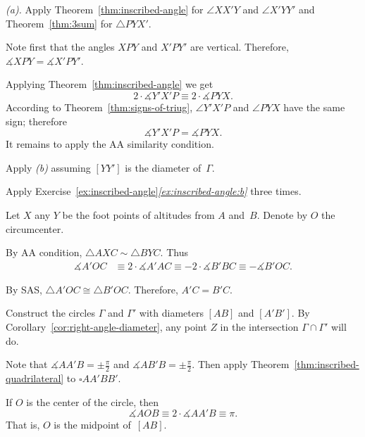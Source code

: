  \textit{(a).}
Apply Theorem~\ref{thm:inscribed-angle} for $\angle XX'Y$ and $\angle X'YY'$
and Theorem~\ref{thm:3sum} for $\triangle PYX'$.

 Note first that the angles $XPY$ and $X'PY'$ are vertical.
Therefore, $\measuredangle XPY=\measuredangle X'PY'$.

Applying Theorem~\ref{thm:inscribed-angle} we get
$$2\cdot \measuredangle Y'X'P\equiv 2\cdot\measuredangle PYX.$$
According to Theorem~\ref{thm:signs-of-triug}, $\angle Y'X'P$ and $\angle PYX$ have the same sign;
therefore
$$\measuredangle Y'X'P= \measuredangle PYX.$$
It remains to apply the AA similarity condition.

 Apply \textit{(b)} assuming $[YY']$ is the diameter of~$\Gamma$. 

 Apply Exercise~\ref{ex:inscribed-angle}\textit{\ref{ex:inscribed-angle:b}}
three times.

Let $X$ any $Y$ be the foot points of altitudes from $A$ and~$B$.
Denote by $O$ the circumcenter.
 
By AA condition, $\triangle A X C\sim \triangle B Y C$.
Thus 
\begin{align*}
\measuredangle A'OC
&\equiv 
2\cdot \measuredangle A' A C
\equiv-2\cdot\measuredangle B' B C
\equiv-\measuredangle B'OC.
\end{align*}


By SAS, $\triangle A'OC\cong\triangle B'OC$.
Therefore, $A'C=B'C$.

Construct the circles $\Gamma$ and $\Gamma'$
with diameters $[AB]$ and $[A'B']$.
By Corollary~\ref{cor:right-angle-diameter},
any point $Z$ in the intersection $\Gamma\cap \Gamma'$ will do.

Note that $\measuredangle AA'B=\pm\tfrac\pi2$ and $\measuredangle AB'B=\pm\tfrac\pi2$.
Then apply Theorem~\ref{thm:inscribed-quadrilateral}
to $\square AA'BB'$.

If $O$ is the center of the circle, then 
$$\measuredangle AOB\equiv 2\cdot \measuredangle AA'B\equiv\pi.$$
That is, $O$ is the midpoint of~$[AB]$.

